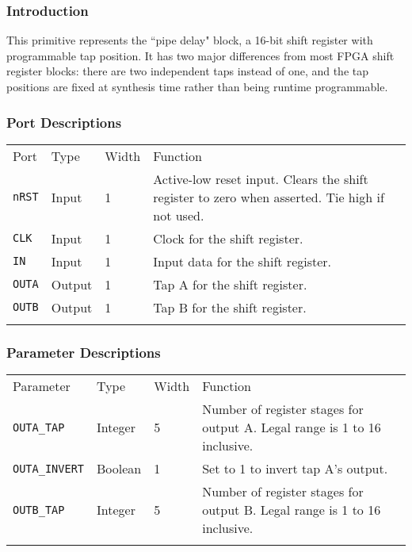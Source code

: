 \documentclass[11pt]{article}
\newcommand{\tokenstyle}[1]{\texttt{#1}}
\newcommand{\whenstyle}[1]{{\fontseries{sb}\selectfont#1}}
\newcommand{\thinhline}{\Xhline{1\arrayrulewidth}}
\newcommand{\thickhline}{\Xhline{2.5\arrayrulewidth}}
\begin{document}
\subsubsection{Introduction}

This primitive represents the ``pipe delay" block, a 16-bit shift register with programmable tap position. It has two
major differences from most FPGA shift register blocks: there are two independent taps instead of one, and the tap
positions are fixed at synthesis time rather than being runtime programmable.

\subsubsection{Port Descriptions}

\begin{tabularx}{\textwidth}{lllX}
\thinhline
\whenstyle{Port} & \whenstyle{Type} & \whenstyle{Width} & \whenstyle{Function} \\
\thickhline
\tokenstyle{nRST} & Input & 1 & Active-low reset input. Clears the shift register to zero when asserted. Tie high if not used.\\
\thinhline
\tokenstyle{CLK} & Input & 1 & Clock for the shift register. \\
\thinhline
\tokenstyle{IN} & Input & 1 & Input data for the shift register. \\
\thinhline
\tokenstyle{OUTA} & Output & 1 & Tap A for the shift register. \\
\thinhline
\tokenstyle{OUTB} & Output & 1 & Tap B for the shift register. \\
\thinhline
\end{tabularx}

\subsubsection{Parameter Descriptions}

\begin{tabularx}{\textwidth}{lllX}
\thinhline
\whenstyle{Parameter} & \whenstyle{Type} & \whenstyle{Width} & \whenstyle{Function} \\
\thickhline
\tokenstyle{OUTA\_TAP} & Integer & 5 & Number of register stages for output A. Legal range is 1 to 16 inclusive.\\
\thinhline
\tokenstyle{OUTA\_INVERT} & Boolean & 1 & Set to 1 to invert tap A's output.\\
\thinhline
\tokenstyle{OUTB\_TAP} & Integer & 5 & Number of register stages for output B. Legal range is 1 to 16 inclusive.\\
\thinhline
\end{tabularx}
\end{document}
